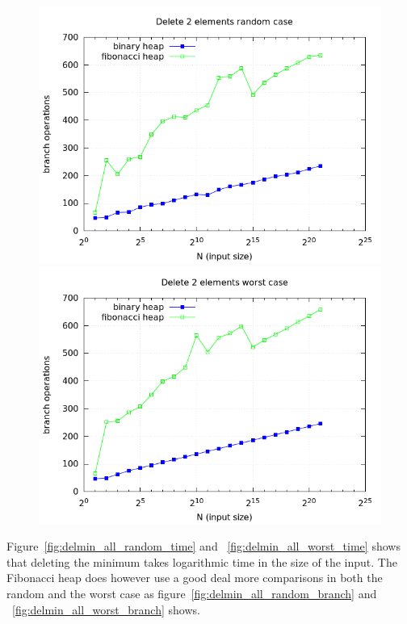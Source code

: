 \documentclass[a4paper,oneside,article,11pt]{memoir}
\begin{document}
\begin{figure}[H]
\centering
\begin{minipage}{0.48\columnwidth}
  \centering
  \includegraphics[width=\linewidth]{../res/delmin/delmin_del_2_branch_random.png}%
  \caption{}
  \label{fig:delmin_2_random_branch}
\end{minipage}%
\hfill
\begin{minipage}{0.48\columnwidth}
  \centering
  \includegraphics[width=\linewidth]{../res/delmin/delmin_del_2_branch_worst.png}%
  \caption{}
  \label{fig:delmin_2_worst_branch}
\end{minipage}
\end{figure}

Figure~\ref{fig:delmin_all_random_time} and ~\ref{fig:delmin_all_worst_time} shows that deleting the minimum takes logarithmic time in the size of the input. The Fibonacci heap does however use a good deal more comparisons in both the random and the worst case as figure~\ref{fig:delmin_all_random_branch} and ~\ref{fig:delmin_all_worst_branch} shows.
\end{document}
